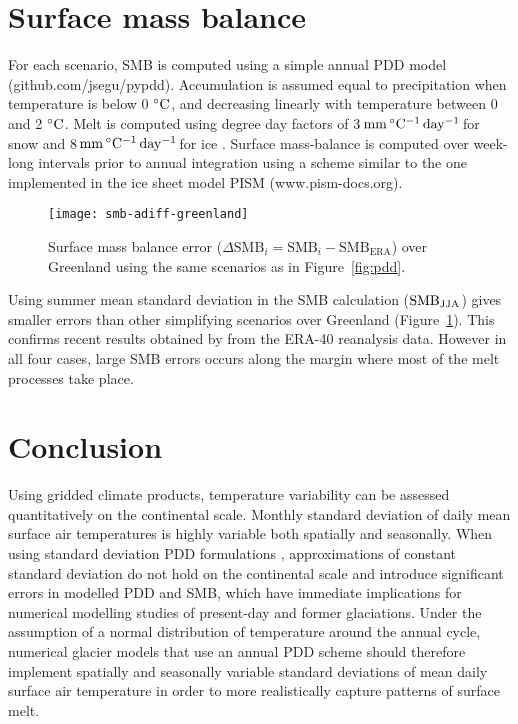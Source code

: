 \documentclass[review]{igs}
\newcommand{\degC}{\,\ensuremath{\rm^\circ C}}
\newcommand{\ddfunit}{\,\ensuremath{\rm mm\,^\circ C^{-1}\,day^{-1}\,}}
\begin{document}

\section{Surface mass balance}

For each scenario, SMB is computed using a simple annual PDD model (github.com/jsegu/pypdd). Accumulation is assumed equal to precipitation when temperature is below 0\,\degC, and decreasing linearly with temperature between 0 and 2\,\degC. Melt is computed using degree day factors of 3\ddfunit for snow and 8\ddfunit for ice \citep{huybrechts-dewolde-1999}. Surface mass-balance is computed over week-long intervals prior to annual integration using a scheme similar to the one implemented in the ice sheet model PISM (www.pism-docs.org).

\begin{figure}
  \centering\texttt{[image: smb-adiff-greenland]}
  \caption{Surface mass balance error ($\Delta\mathrm{SMB}_i = \mathrm{SMB}_i - \mathrm{SMB_{ERA}}$) over Greenland using the same scenarios as in Figure~\ref{fig:pdd}.}
  \label{fig:smb}
\end{figure}

Using summer mean standard deviation in the SMB calculation ($\rm SMB_{JJA}$) gives smaller errors than other simplifying scenarios over Greenland (Figure~\ref{fig:smb}). This confirms recent results obtained by \citet{rau-rogozhina-2013} from the ERA-40 reanalysis data. However in all four cases, large SMB errors occurs along the margin where most of the melt processes take place.


\section{Conclusion}

Using gridded climate products, temperature variability can be assessed quantitatively on the continental scale. Monthly standard deviation of daily mean surface air temperatures is highly variable both spatially and seasonally. When using standard deviation PDD formulations \citep{braithwaite-1984,reeh-1991,calov-greve-2005}, approximations of constant standard deviation do not hold on the continental scale and introduce significant errors in modelled PDD and SMB, which have immediate implications for numerical modelling studies of present-day and former glaciations. Under the assumption of a normal distribution of temperature around the annual cycle, numerical glacier models that use an annual PDD scheme should therefore implement spatially and seasonally variable standard deviations of mean daily surface air temperature in order to more realistically capture patterns of surface melt.
\end{document}
